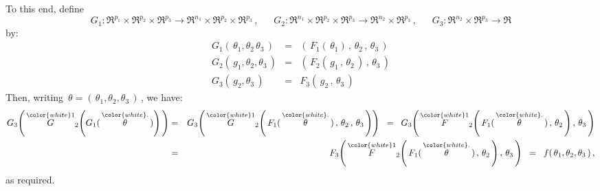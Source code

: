 To this end, define
\begin{equation*}
G_{1} : \Re^{p_{1}}\times\Re^{p_{2}}\times\Re^{p_{3}}
	\longrightarrow
	\Re^{n_{1}}\times\Re^{p_{2}}\times\Re^{p_{3}}\,,
\quad\;\;
G_{2} : \Re^{n_{1}}\times\Re^{p_{2}}\times\Re^{p_{3}}
	\longrightarrow
	\Re^{n_{2}}\times\Re^{p_{3}}\,,
\quad\;\;
G_{3} : \Re^{n_{2}}\times\Re^{p_{3}} \longrightarrow \Re
\end{equation*}
by:
\begin{eqnarray*}
G_{1}(\,\theta_{1},\theta_{2}\,\theta_{3}\,) & = & \left(\,F_{1}(\,\theta_{1})\,,\,\theta_{2}\,,\,\theta_{3}\,\right)
\\
G_{2}(\,g_{1},\theta_{2},\theta_{3}\,) & = & \left(\,F_{2}(\,g_{1}\,,\,\theta_{2}\,)\,,\,\theta_{3}\,\right)
\\
G_{3}(\,g_{2},\theta_{3}\,) & = & F_{3}\left(\,g_{2}\,,\,\theta_{3}\,\right)
\end{eqnarray*}
Then, writing \,$\theta = (\,\theta_{1},\theta_{2},\theta_{3}\,)$\,, we have:
\begin{eqnarray*}
	G_{3}\!\left(\,
		\overset{{\color{white}1}}{G}_{2}\!\left(
			G_{1}(\,\overset{{\color{white}.}}{\theta}\,)
			\right)
		\,\right)
& = &
	G_{3}\!\left(\,
		\overset{{\color{white}1}}{G}_{2}\!\left(\,
			F_{1}(\,\overset{{\color{white}.}}{\theta}\,)\,,\,\theta_{2}\,,\,\theta_{3}
			\,\right)
		\right)
\;\; = \;\;
	G_{3}\!\left(\,
		\overset{{\color{white}1}}{F}_{2}\!\left(\,
			F_{1}(\,\overset{{\color{white}.}}{\theta}\,)\,,\,\theta_{2}\,\right)
			,\,
			\theta_{3}
		\,\right)
\\
& = &
	F_{3}\!\left(\,
		\overset{{\color{white}1}}{F}_{2}\!\left(\,
			F_{1}(\,\overset{{\color{white}.}}{\theta}\,)\,,\,\theta_{2}\,\right)
			,\,
			\theta_{3}
		\,\right)
\;\; = \;\;
	f(\,\theta_{1},\theta_{2},\theta_{3}\,)\,,
\end{eqnarray*}
as required.


\renewcommand{\theenumi}{\roman{enumi}}
\renewcommand{\labelenumi}{\textnormal{(\theenumi)}$\;\;$}

